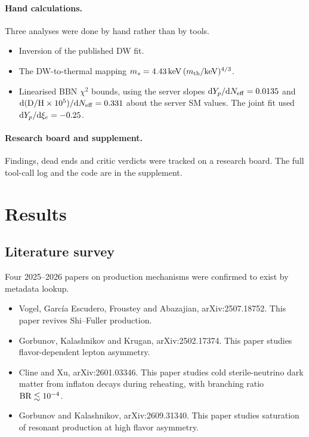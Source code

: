 \documentclass[11pt,a4paper]{article}
\begin{document}
\paragraph{Hand calculations.} Three analyses were done by hand rather than by tools.
\begin{itemize}
\item Inversion of the published DW fit.
\item The DW-to-thermal mapping $m_s=4.43\,{\rm keV}\,(m_{\rm th}/{\rm keV})^{4/3}$.
\item Linearised BBN $\chi^2$ bounds, using the server slopes ${\rm d}Y_p/{\rm d}N_{\rm eff}=0.0135$ and ${\rm d}({\rm D/H}\times10^5)/{\rm d}N_{\rm eff}=0.331$ about the server SM values. The joint fit used ${\rm d}Y_p/{\rm d}\xi_e=-0.25$.
\end{itemize}

\paragraph{Research board and supplement.} Findings, dead ends and critic verdicts were tracked on a research board. The full tool-call log and the code are in the supplement.

\section{Results}
\subsection{Literature survey}
Four 2025--2026 papers on production mechanisms were confirmed to exist by metadata lookup.
\begin{itemize}
\item Vogel, Garc\'ia Escudero, Froustey and Abazajian, arXiv:2507.18752. This paper revives Shi--Fuller production.
\item Gorbunov, Kalashnikov and Krugan, arXiv:2502.17374. This paper studies flavor-dependent lepton asymmetry.
\item Cline and Xu, arXiv:2601.03346. This paper studies cold sterile-neutrino dark matter from inflaton decays during reheating, with branching ratio ${\rm BR}\lesssim10^{-4}$.
\item Gorbunov and Kalashnikov, arXiv:2609.31340. This paper studies saturation of resonant production at high flavor asymmetry.
\end{itemize}
\end{document}
